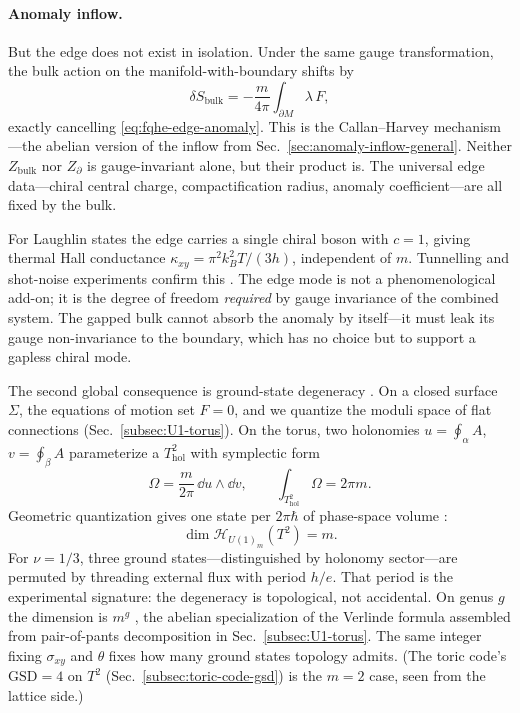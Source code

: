 \paragraph{Anomaly inflow.}
But the edge does not exist in isolation. Under the same gauge transformation, the bulk action on the manifold-with-boundary shifts by
\begin{equation}
  \delta S_{\mathrm{bulk}} = -\frac{m}{4\pi}\int_{\partial M}\lambda\,F,
  \label{eq:fqhe-bulk-anomaly}
\end{equation}
exactly cancelling \eqref{eq:fqhe-edge-anomaly}. This is the Callan--Harvey mechanism \cite{CallanHarvey1985,Wen1995TopologicalOrdersEdgeExcitations,Witten2016ThreeLecturesTopologicalPhases}---the abelian version of the inflow from Sec.~\ref{sec:anomaly-inflow-general}. Neither $Z_{\mathrm{bulk}}$ nor $Z_{\partial}$ is gauge-invariant alone, but their product is. The universal edge data---chiral central charge, compactification radius, anomaly coefficient---are all fixed by the bulk.

For Laughlin states the edge carries a single chiral boson with $c=1$, giving thermal Hall conductance $\kappa_{xy} = \pi^{2}k_{B}^{2}T/(3h)$, independent of $m$. Tunnelling and shot-noise experiments confirm this \cite{Wen1995TopologicalOrdersEdgeExcitations,Witten2016ThreeLecturesTopologicalPhases}. The edge mode is not a phenomenological add-on; it is the degree of freedom \emph{required} by gauge invariance of the combined system. The gapped bulk cannot absorb the anomaly by itself---it must leak its gauge non-invariance to the boundary, which has no choice but to support a gapless chiral mode.

The second global consequence is ground-state degeneracy \cite{WenNiu1990GroundStateDegeneracy}. On a closed surface $\Sigma$, the equations of motion set $F=0$, and we quantize the moduli space of flat connections (Sec.~\ref{subsec:U1-torus}). On the torus, two holonomies $u=\oint_\alpha A$, $v=\oint_\beta A$ parameterize a $T^{2}_{\mathrm{hol}}$ with symplectic form
\begin{equation}
  \Omega = \frac{m}{2\pi}\,\dd u\wedge\dd v,
  \qquad
  \int_{T^{2}_{\mathrm{hol}}}\Omega = 2\pi m.
  \label{eq:fqhe-symplectic}
\end{equation}
Geometric quantization gives one state per $2\pi\hbar$ of phase-space volume \cite{ElitzurMooreSchwimmerSeiberg1989CanonicalCS}:
\begin{equation}
  \dim\mathcal{H}_{U(1)_m}(T^{2}) = m.
  \label{eq:fqhe-torus-degeneracy}
\end{equation}
For $\nu=1/3$, three ground states---distinguished by holonomy sector---are permuted by threading external flux with period $h/e$. That period is the experimental signature: the degeneracy is topological, not accidental. On genus $g$ the dimension is $m^{g}$ \cite{WenNiu1990GroundStateDegeneracy}, the abelian specialization of the Verlinde formula assembled from pair-of-pants decomposition in Sec.~\ref{subsec:U1-torus}. The same integer fixing $\sigma_{xy}$ and $\theta$ fixes how many ground states topology admits. (The toric code's $\mathrm{GSD} = 4$ on $T^2$ (Sec.~\ref{subsec:toric-code-gsd}) is the $m=2$ case, seen from the lattice side.)

